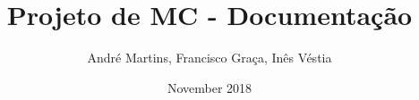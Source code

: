 \documentclass[11pt,a4paper]{article}
\begin{document}
\title{Projeto de MC - Documentação}
\author{André Martins, Francisco Graça, Inês Véstia}
\date{November 2018}
\maketitle
\end{document}
